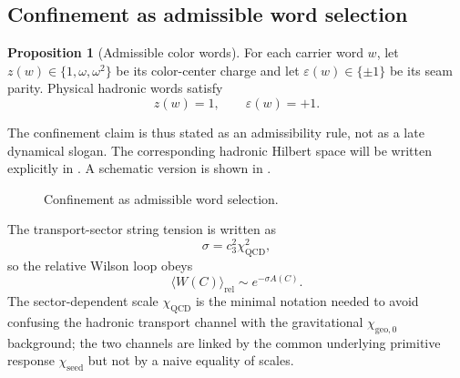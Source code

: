 \documentclass[11pt,a4paper]{article}
\theoremstyle{definition}
\newtheorem{proposition}[theorem]{Proposition}
\theoremstyle{remark}
\newcommand{\cthree}{c_3}
\newcommand{\QCD}{\mathrm{QCD}}
\newcommand{\chiseed}{\chi_{\mathrm{seed}}}
\newcommand{\chigeozero}{\chi_{\mathrm{geo},0}}
\begin{document}
\subsection{Confinement as admissible word selection}

\begin{proposition}[Admissible color words]
For each carrier word $w$, let $z(w)\in\{1,\omega,\omega^2\}$ be its color-center charge and let $\varepsilon(w)\in\{\pm1\}$ be its seam parity. Physical hadronic words satisfy
\[
z(w)=1,
\qquad
\varepsilon(w)=+1.
\]
\end{proposition}

The confinement claim is thus stated as an admissibility rule, not as a late dynamical slogan. The corresponding hadronic Hilbert space will be written explicitly in . A schematic version is shown in .

\begin{figure}[t]
\centering
{}
\caption{Confinement as admissible word selection.}
\label{fig:admissible-words}
\end{figure}

The transport-sector string tension is written as
\[
\sigma=\cthree^2\chi_{\QCD}^2,
\]
so the relative Wilson loop obeys
\[
\langle W(C)\rangle_{\mathrm{rel}}\sim e^{-\sigma A(C)}.
\]
The sector-dependent scale $\chi_{\QCD}$ is the minimal notation needed to avoid confusing the hadronic transport channel with the gravitational $\chigeozero$ background; the two channels are linked by the common underlying primitive response $\chiseed$ but not by a naive equality of scales.
\end{document}
